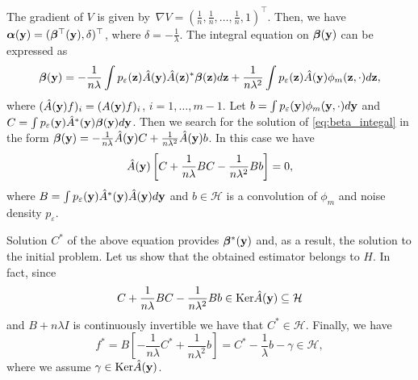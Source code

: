 The gradient of $V$ is given
by~$\nabla V = (\frac{1}{n}, \frac{1}{n}, \ldots, \frac{1}{n}, 1)^{\top}$.
Then, we have ${\bm \alpha}({\bf y}) = ({\bm \beta}^{\top}({\bf y}), \delta)^{\top}$,
where $\delta = -\frac{1}{\lambda}$.
The integral equation on ${\bm \beta}({\bf y})$ can be expressed as
\begin{equation}
    {\bm \beta}({\bf y}) = -\frac{1}{n\lambda}\int p_{\varepsilon}({\bf z})\hat{A}({\bf y})\hat{A}({\bf z})^*{\bm \beta}({\bf z})d{\bf z} + \frac{1}{n\lambda^2}\int p_{\varepsilon}({\bf z}) \hat{A}({\bf y}) \phi_m({\bf z}, \cdot)d{\bf z},
\end{equation}
where $(\hat{A}({\bf y})f)_i = (A({\bf y})f)_i$, $i = 1, \ldots, m - 1$.
Let $b = \int p_{\varepsilon}({\bf y})\phi_m({\bf y}, \cdot) d {\bf y}$ and
$C = \int p_{\varepsilon}({\bf y})\hat{A}^*({\bf y}){\bm \beta}({\bf y}) d {\bf y}$.
Then we search for the solution of \eqref{eq:beta_integal} in the form
${\bm \beta}({\bf y}) = -\frac{1}{n\lambda}\hat{A}({\bf y})C + \frac{1}{n\lambda^2}\hat{A}({\bf y})b$.
In this case we have
\begin{equation*}
    \hat{A}({\bf y})\left[C + \frac{1}{n\lambda}BC - \frac{1}{n\lambda^2}Bb\right] = 0,
\end{equation*}
where $B = \int p_{\varepsilon}({\bf y})\hat{A}^*({\bf y})\hat{A}({\bf y}) d{\bf y}$ and
$b \in \mathcal{H}$ is a convolution of $\phi_m$ and noise density $p_{\varepsilon}$.

Solution $C^*$ of the above equation provides ${\bm \beta}^*({\bf y})$ and, as a result,
the solution to the initial problem.
Let us show that the obtained estimator belongs to $H$.
In fact, since
\[
    C + \frac{1}{n\lambda}BC - \frac{1}{n\lambda^2}Bb \in {\rm Ker}\hat{A}({\bf y}) \subseteq
    \mathcal{H}
\]
and $B + n\lambda I$ is continuously invertible we have that $C^* \in \mathcal{H}$.
Finally, we have
\[
    f^* = B\left[-\frac{1}{n\lambda}C^* + \frac{1}{n\lambda^2}b\right] = C^* - \frac{1}{\lambda}b - \gamma \in \mathcal{H},
\]
where we assume $\gamma \in {\rm Ker}\hat{A}({\bf y})$.



